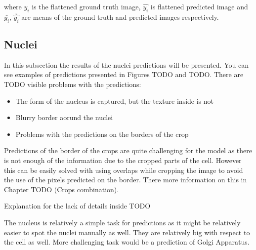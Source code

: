 where $y_i$ is the flattened ground truth image, $\hat{y_i}$ is flattened predicted image and $\bar{y_i}$, $\bar{\hat{y_i}}$ are means of the ground truth and predicted images respectively.

\subsection{Nuclei}
In this subsection the results of the nuclei predictions will be presented. You can see examples of predictions presented in Figures TODO and TODO. There are TODO visible problems with the predictions:
\begin{itemize}
    \item The form of the nucleus is captured, but the texture inside is not
    \item Blurry border aorund the nuclei
    \item Problems with the predictions on the borders of the crop
\end{itemize}
Predictions of the border of the crops are quite challenging for the model as there is not enough of the information due to the cropped parts of the cell. However this can be easily solved with using overlaps while cropping the image to avoid the use of the pixels predicted on the border. There more information on this in Chapter TODO (Crops combination).

Explanation for the lack of details inside TODO

The nucleus is relatively a simple task for predictions as it might be relatively easier to spot the nuclei manually as well. They are relatively big with respect to the cell as well. More challenging task would be a prediction of Golgi Apparatus.
